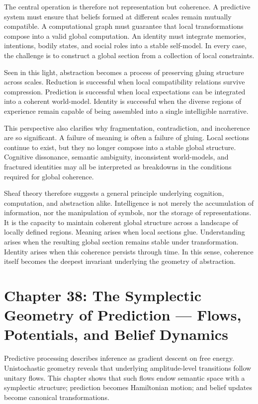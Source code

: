 \documentclass[12pt,letterpaper]{article}
\theoremstyle{remark}
\begin{document}
The central operation is therefore not representation but coherence. A predictive system must ensure that beliefs formed at different scales remain mutually compatible. A computational graph must guarantee that local transformations compose into a valid global computation. An identity must integrate memories, intentions, bodily states, and social roles into a stable self-model. In every case, the challenge is to construct a global section from a collection of local constraints.

Seen in this light, abstraction becomes a process of preserving gluing structure across scales. Reduction is successful when local compatibility relations survive compression. Prediction is successful when local expectations can be integrated into a coherent world-model. Identity is successful when the diverse regions of experience remain capable of being assembled into a single intelligible narrative.

This perspective also clarifies why fragmentation, contradiction, and incoherence are so significant. A failure of meaning is often a failure of gluing. Local sections continue to exist, but they no longer compose into a stable global structure. Cognitive dissonance, semantic ambiguity, inconsistent world-models, and fractured identities may all be interpreted as breakdowns in the conditions required for global coherence.

Sheaf theory therefore suggests a general principle underlying cognition, computation, and abstraction alike. Intelligence is not merely the accumulation of information, nor the manipulation of symbols, nor the storage of representations. It is the capacity to maintain coherent global structure across a landscape of locally defined regions. Meaning arises when local sections glue. Understanding arises when the resulting global section remains stable under transformation. Identity arises when this coherence persists through time. In this sense, coherence itself becomes the deepest invariant underlying the geometry of abstraction.

\newpage

\section{Chapter 38: The Symplectic Geometry of Prediction —  
Flows, Potentials, and Belief Dynamics}

Predictive processing describes inference as gradient descent on free energy. Unistochastic geometry reveals that underlying amplitude-level transitions follow unitary flows. This chapter shows that such flows endow semantic space with a symplectic structure; prediction becomes Hamiltonian motion; and belief updates become canonical transformations.
\end{document}
